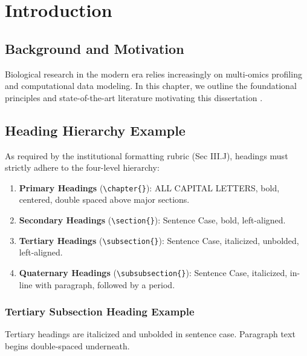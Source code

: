 \chapter{Introduction}
\label{ch:introduction}

\section{Background and Motivation}
Biological research in the modern era relies increasingly on multi-omics profiling and computational data modeling. In this chapter, we outline the foundational principles and state-of-the-art literature motivating this dissertation \cite{Horvath2013}.

\section{Heading Hierarchy Example}
As required by the institutional formatting rubric (Sec III.J), headings must strictly adhere to the four-level hierarchy:
\begin{enumerate}
  \item \textbf{Primary Headings} (\verb|\chapter{}|): ALL CAPITAL LETTERS, bold, centered, double spaced above major sections.
  \item \textbf{Secondary Headings} (\verb|\section{}|): Sentence Case, bold, left-aligned.
  \item \textbf{Tertiary Headings} (\verb|\subsection{}|): Sentence Case, italicized, unbolded, left-aligned.
  \item \textbf{Quaternary Headings} (\verb|\subsubsection{}|): Sentence Case, italicized, in-line with paragraph, followed by a period.
\end{enumerate}

\subsection{Tertiary Subsection Heading Example}
Tertiary headings are italicized and unbolded in sentence case. Paragraph text begins double-spaced underneath.

